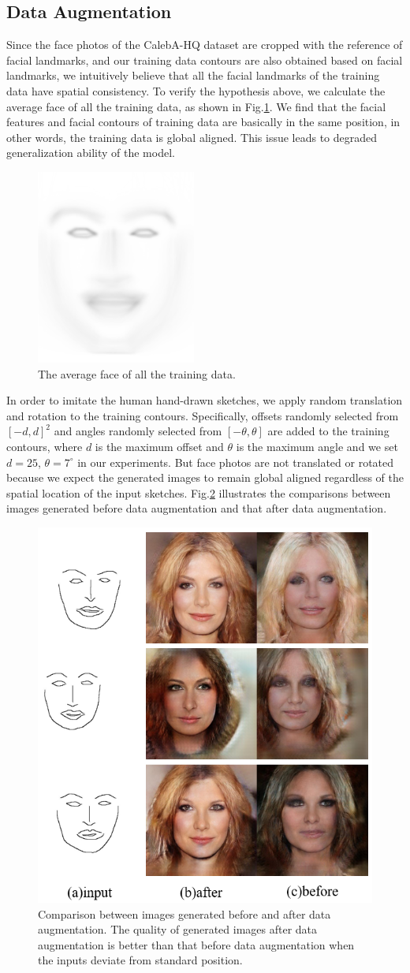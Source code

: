 \documentclass[10pt,twocolumn,letterpaper]{article}
\begin{document}
\subsection{Data Augmentation}\label{sec:augmentation} 
Since the face photos of the CalebA-HQ dataset are cropped with the reference of facial landmarks, and our training data contours are also obtained based on facial landmarks, we intuitively believe that all the facial landmarks of the training data have spatial consistency. 
To verify the hypothesis above, we calculate the average face of all the training data, as shown in Fig.\ref{fig:average_face}. We find that the facial features and facial contours of training data are basically in the same position, in other words, the training data is global aligned. This issue leads to degraded generalization ability of the model. 
\begin{figure}[htb]
	\centering
	\includegraphics[width=0.18 \textwidth]{average_face.png}
	\caption{The average face of all the training data. }
	\label{fig:average_face}
\end{figure}
In order to imitate the human hand-drawn sketches, we apply random translation and rotation to the training contours. Specifically, offsets randomly selected from $[-d,d]^2$ and angles randomly selected from $[-\theta,\theta]$ are added to the training contours, where $d$ is the maximum offset and $\theta$ is the maximum angle and we set $d=25$, $\theta=7^\circ$ in our experiments. 
But face photos are not translated or rotated because we expect the generated images to remain global aligned regardless of the spatial location of the input sketches.
Fig.\ref{fig:data_augmentation} illustrates the comparisons between images generated before data augmentation and  that after data augmentation. 
\begin{figure}[htb]
	\centering
	\includegraphics[width=0.35 \textwidth]{data_augmentation.png}
	\caption{Comparison between images generated before and after data augmentation. The quality of generated images after data augmentation is better than that before data augmentation when the inputs deviate from standard position.}
	\label{fig:data_augmentation}
\end{figure}
\end{document}
